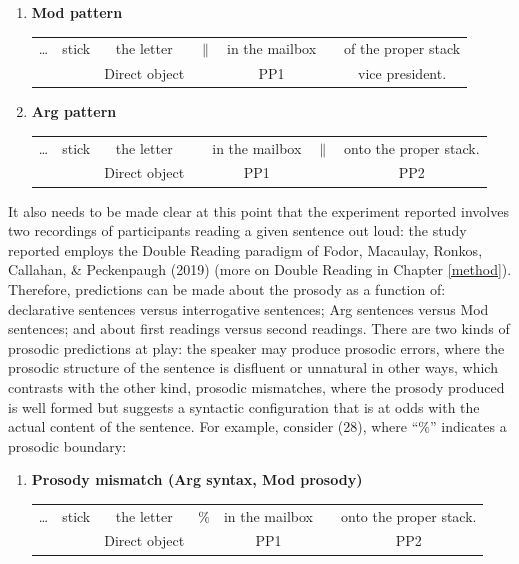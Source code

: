 \documentclass[11pt,oneside]{book}
\providecommand{\tightlist}{%
  \setlength{\itemsep}{0pt}\setlength{\parskip}{0pt}}
\begin{document}
\singlespacing

\begin{enumerate}
\def\labelenumi{(\arabic{enumi})}
\setcounter{enumi}{25}
\tightlist
\item
  \textbf{Mod pattern}
  \begingroup
  \setlength{\tabcolsep}{2pt}

  \begin{tabular}{ccccccc}
    \dots & stick & the letter & $\|$ & in the mailbox &  & of the proper stack \\
    & & \footnotesize Direct object & & \footnotesize PP1 & & \footnotesize vice president. \\
  \end{tabular}
    \endgroup
\item
  \textbf{Arg pattern}
  \begingroup
  \setlength{\tabcolsep}{2pt}

  \begin{tabular}{ccccccc}
    \dots & stick & the letter & & in the mailbox & $\|$ & onto the proper stack. \\
    & & \footnotesize Direct object & & \footnotesize PP1 & & \footnotesize PP2 \\
  \end{tabular}
    \endgroup
\end{enumerate}

\doublespacing

It also needs to be made clear at this point that the experiment reported involves two recordings of participants reading a given sentence out loud: the study reported employs the Double Reading paradigm of Fodor, Macaulay, Ronkos, Callahan, \& Peckenpaugh (2019) (more on Double Reading in Chapter \ref{method}). Therefore, predictions can be made about the prosody as a function of: declarative sentences versus interrogative sentences; Arg sentences versus Mod sentences; and about first readings versus second readings. There are two kinds of prosodic predictions at play: the speaker may produce prosodic errors, where the prosodic structure of the sentence is disfluent or unnatural in other ways, which contrasts with the other kind, prosodic mismatches, where the prosody produced is well formed but suggests a syntactic configuration that is at odds with the actual content of the sentence. For example, consider (28), where ``\(\%\)'' indicates a prosodic boundary:

\singlespacing

\begin{enumerate}
\def\labelenumi{(\arabic{enumi})}
\setcounter{enumi}{27}
\tightlist
\item
  \textbf{Prosody mismatch (Arg syntax, Mod prosody)}
  \begingroup
  \setlength{\tabcolsep}{2pt}

  \begin{tabular}{ccccccc}
    \dots & stick & the letter & $\%$ & in the mailbox & & onto the proper stack. \\
    & & \footnotesize Direct object & & \footnotesize PP1 & & \footnotesize PP2 \\
  \end{tabular}
    \endgroup
\end{enumerate}
\end{document}
